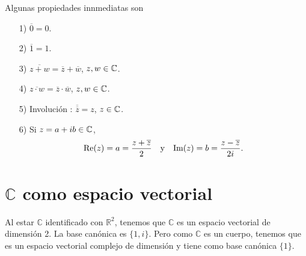 Algunas propiedades innmediatas son
\begin{enumerate}
    \item[1)] $\overline{0} = 0$.
    \item[2)] $\overline{1} = 1$.
    \item[3)] $\overline{z + w} = \overline{z} + \overline{w}$, $z,w \in \mathbb{C}$.
    \item[4)] $\overline{z \cdot w} = \overline{z} \cdot \overline{w}$, $z,w \in \mathbb{C}$.
    \item[5)] Involución : $\overline{\overline{z}} = z$, $z \in \mathbb{C}$.
    \item[6)] Si $z = a + ib \in \mathbb{C}$,
          \begin{align*}
              \re(z) = a = \frac{z + \overline{z}}{2} \ \ \ \text{y} \ \ \ \im(z) = b = \frac{z - \overline{z}}{2i}.
          \end{align*}
\end{enumerate}

\section{$\mathbb{C}$ como espacio vectorial}
Al estar $\mathbb{C}$ identificado con $\mathbb{R}^2$, tenemos que $\mathbb{C}$ es un espacio vectorial de dimensión 2. La base canónica es $\{1,i\}$. Pero como $\mathbb{C}$ es un cuerpo, tenemos que es un espacio vectorial complejo de dimensión y tiene como base canónica $\{1\}$.

